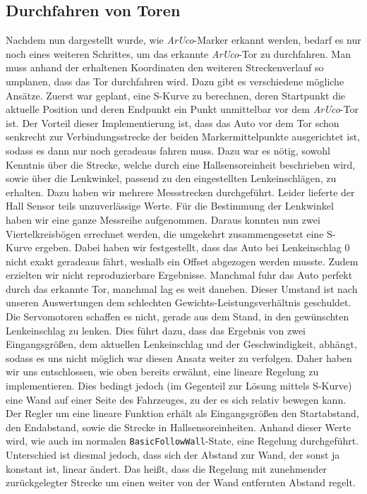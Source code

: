 \subsection{Durchfahren von Toren}
Nachdem nun dargestellt wurde, wie \textit{ArUco}-Marker erkannt werden, bedarf es nur noch eines weiteren Schrittes, um das erkannte \textit{ArUco}-Tor zu durchfahren. Man muss anhand der erhaltenen Koordinaten den weiteren Streckenverlauf so umplanen, dass das Tor durchfahren wird. 
\newline
Dazu gibt es verschiedene mögliche Ansätze. Zuerst war geplant, eine S-Kurve zu berechnen, deren Startpunkt die aktuelle Position und deren Endpunkt ein Punkt unmittelbar vor dem \textit{ArUco}-Tor ist. Der Vorteil dieser Implementierung ist, dass das Auto vor dem Tor schon senkrecht zur Verbindungsstrecke der beiden Markermittelpunkte ausgerichtet ist, sodass es dann nur noch geradeaus fahren muss. Dazu war es nötig, sowohl Kenntnis über die Strecke, welche durch eine Hallsensoreinheit beschrieben wird, sowie über die Lenkwinkel, passend zu den eingestellten Lenkeinschlägen, zu erhalten. Dazu haben wir mehrere Messstrecken durchgeführt. Leider lieferte der Hall Sensor teils unzuverlässige Werte. Für die Bestimmung der Lenkwinkel haben wir eine ganze Messreihe aufgenommen. Daraus konnten nun zwei Viertelkreisbögen errechnet werden, die umgekehrt zusammengesetzt eine S-Kurve ergeben. Dabei haben wir festgestellt, dass das Auto bei Lenkeinschlag 0 nicht exakt geradeaus fährt, weshalb ein Offset abgezogen werden musste. Zudem erzielten wir nicht reproduzierbare Ergebnisse. Manchmal fuhr das Auto perfekt durch das erkannte Tor, manchmal lag es weit daneben. Dieser Umstand ist nach unseren Auswertungen dem schlechten Gewichts-Leistungsverhältnis geschuldet. Die Servomotoren schaffen es nicht, gerade aus dem Stand, in den gewünschten Lenkeinschlag zu lenken. Dies führt dazu, dass das Ergebnis von zwei Eingangsgrößen, dem aktuellen Lenkeinschlag und der Geschwindigkeit, abhängt, sodass es uns nicht möglich war diesen Ansatz weiter zu verfolgen. 
\newline
\newline
Daher haben wir uns entschlossen, wie oben bereits erwähnt, eine lineare Regelung zu implementieren. Dies bedingt jedoch (im Gegenteil zur Lösung mittels S-Kurve) eine Wand auf einer Seite des Fahrzeuges, zu der es sich relativ bewegen kann. 
\newline
\newline
Der Regler um eine lineare Funktion erhält als Eingangsgrößen den Startabstand, den Endabstand, sowie die Strecke in Hallsensoreinheiten. Anhand dieser Werte wird, wie auch im normalen \texttt{BasicFollowWall}-State, eine Regelung durchgeführt. Unterschied ist diesmal jedoch, dass sich der Abstand zur Wand, der sonst ja konstant ist, linear ändert. Das heißt, dass die Regelung mit zunehmender zurückgelegter Strecke um einen weiter von der Wand entfernten Abstand regelt. 
